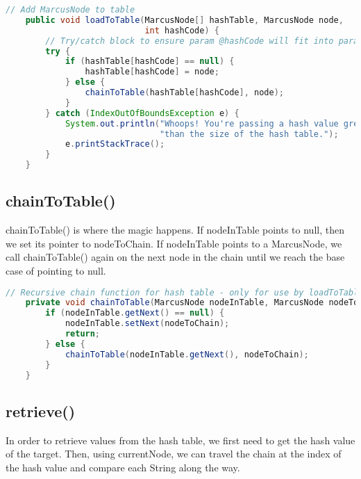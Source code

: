 \documentclass[letterpaper, 10pt]{article}
\begin{document}
\vspace{2.0em}

\begin{lstlisting}[language=Java, firstnumber=42]
    // Add MarcusNode to table
    public void loadToTable(MarcusNode[] hashTable, MarcusNode node,
                            int hashCode) {
        // Try/catch block to ensure param @hashCode will fit into param @hashTable
        try {
            if (hashTable[hashCode] == null) {
                hashTable[hashCode] = node;
            } else {
                chainToTable(hashTable[hashCode], node);
            }
        } catch (IndexOutOfBoundsException e) {
            System.out.println("Whoops! You're passing a hash value greater " +
                               "than the size of the hash table.");
            e.printStackTrace();
        }
    }
\end{lstlisting}

\subsection{chainToTable()}

\hspace{1.0em}chainToTable() is where the magic happens. If nodeInTable points to null, then we set its pointer to nodeToChain. If nodeInTable points to a MarcusNode, we call chainToTable() again on the next node in the chain until we reach the base case of pointing to null.

\vspace{2.0em}

\begin{lstlisting}[language=Java, firstnumber=59]
    // Recursive chain function for hash table - only for use by loadToTable()
    private void chainToTable(MarcusNode nodeInTable, MarcusNode nodeToChain) {
        if (nodeInTable.getNext() == null) {
            nodeInTable.setNext(nodeToChain);
            return;
        } else {
            chainToTable(nodeInTable.getNext(), nodeToChain);
        }
    }
\end{lstlisting}

\subsection{retrieve()}

\hspace{1.0em}In order to retrieve values from the hash table, we first need to get the hash value of the target. Then, using currentNode, we can travel the chain at the index of the hash value and compare each String along the way.
\end{document}
